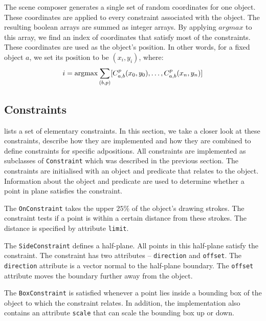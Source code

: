 The scene composer generates a single set of random coordinates for one object. These coordinates are applied to every constraint associated with the object. The resulting boolean arrays are summed as integer arrays. By applying $argmax$ to this array, we find an index of coordinates that satisfy most of the constraints. These coordinates are used as the object's position. In other words, for a fixed object $a$, we set its position to be $(x_i, y_i)$, where:
\begin{align}
i = \operatorname{argmax} \sum_{(b, p)} [C_{a,b}^p(x_0, y_0), \ldots, C_{a,b}^p(x_n, y_n)]
\end{align}

\subsection{Constraints}
\label{sec:constraints_impl}

 lists a set of elementary constraints. In this section, we take a closer look at these constraints, describe how they are implemented and how they are combined to define constraints for specific adpositions. All constraints are implemented as subclasses of \verb|Constraint| which was described in the previous section. The constraints are initialised with an object and predicate that relates to the object. Information about the object and predicate are used to determine whether a point in plane satisfies the constraint.

\medskip

The \verb|OnConstraint| takes the upper $25\%$ of the object's drawing strokes. The constraint tests if a point is within a certain distance from these strokes. The distance is specified by attribute \verb|limit|.

\medskip

The \verb|SideConstraint| defines a half-plane. All points in this half-plane satisfy the constraint.  The constraint has two attributes -- \verb|direction| and \verb|offset|. The \verb|direction| attribute is a vector normal to the half-plane boundary.  The \verb|offset| attribute moves the boundary further away from the object.

\medskip

The \verb|BoxConstraint| is satisfied whenever a point lies inside a bounding box of the object to which the constraint relates. In addition, the implementation also contains an attribute \verb|scale| that can scale the bounding box up or down.

